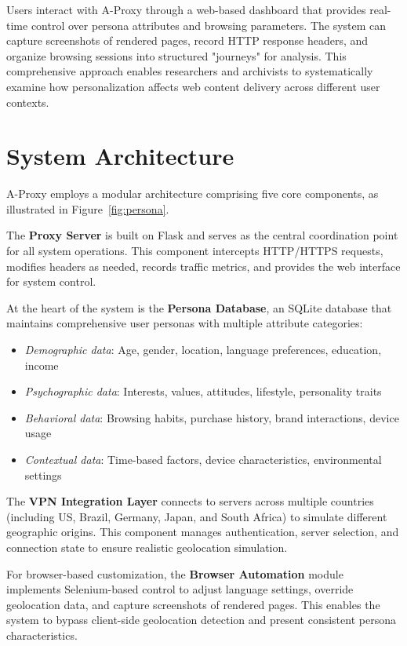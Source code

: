 \documentclass[sigconf]{acmart}
\begin{document}
Users interact with A-Proxy through a web-based dashboard that provides real-time control over persona attributes and browsing parameters. The system can capture screenshots of rendered pages, record HTTP response headers, and organize browsing sessions into structured "journeys" for analysis. This comprehensive approach enables researchers and archivists to systematically examine how personalization affects web content delivery across different user contexts.

\section{System Architecture}
A-Proxy employs a modular architecture comprising five core components, as illustrated in Figure~\ref{fig:persona}.

The \textbf{Proxy Server} is built on Flask and serves as the central coordination point for all system operations. This component intercepts HTTP/HTTPS requests, modifies headers as needed, records traffic metrics, and provides the web interface for system control.

At the heart of the system is the \textbf{Persona Database}, an SQLite database that maintains comprehensive user personas with multiple attribute categories:
\begin{itemize}
    \item \textit{Demographic data}: Age, gender, location, language preferences, education, income
    \item \textit{Psychographic data}: Interests, values, attitudes, lifestyle, personality traits
    \item \textit{Behavioral data}: Browsing habits, purchase history, brand interactions, device usage
    \item \textit{Contextual data}: Time-based factors, device characteristics, environmental settings
\end{itemize}

The \textbf{VPN Integration Layer} connects to servers across multiple countries (including US, Brazil, Germany, Japan, and South Africa) to simulate different geographic origins. This component manages authentication, server selection, and connection state to ensure realistic geolocation simulation.

For browser-based customization, the \textbf{Browser Automation} module implements Selenium-based control to adjust language settings, override geolocation data, and capture screenshots of rendered pages. This enables the system to bypass client-side geolocation detection and present consistent persona characteristics.
\end{document}
